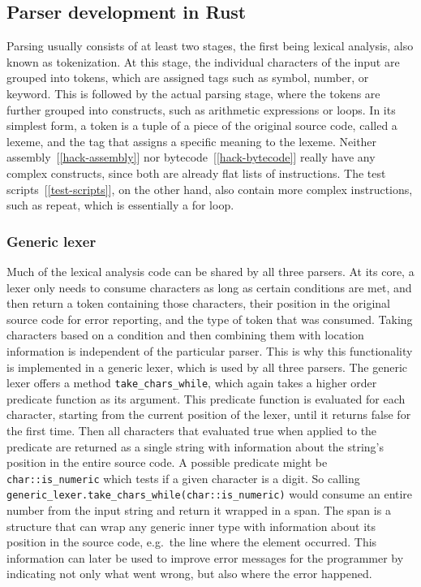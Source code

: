 \subsection{Parser development in Rust} \label{parser-dev}
Parsing usually consists of at least two stages, the first being lexical analysis, also known as tokenization.
At this stage, the individual characters of the input are grouped into tokens, which are assigned tags such as symbol, number, or keyword.
This is followed by the actual parsing stage, where the tokens are further grouped into constructs, such as arithmetic expressions or loops.
In its simplest form, a token is a tuple of a piece of the original source code, called a lexeme, and the tag that assigns a specific meaning to the lexeme.
Neither assembly~[\ref{hack-assembly}] nor bytecode~[\ref{hack-bytecode}] really have any complex constructs, since both are already flat lists of instructions.
The test scripts~[\ref{test-scripts}], on the other hand, also contain more complex instructions, such as repeat, which is essentially a for loop.

\subsubsection{Generic lexer}
Much of the lexical analysis code can be shared by all three parsers.
At its core, a lexer only needs to consume characters as long as certain conditions are met, and then return a token containing those characters, their position in the original source code for error reporting, and the type of token that was consumed.
Taking characters based on a condition and then combining them with location information is independent of the particular parser.
This is why this functionality is implemented in a generic lexer, which is used by all three parsers.
The generic lexer offers a method \verb+take_chars_while+, which again takes a higher order predicate function as its argument.
This predicate function is evaluated for each character, starting from the current position of the lexer, until it returns false for the first time.
Then all characters that evaluated true when applied to the predicate are returned as a single string with information about the string's position in the entire source code.
A possible predicate might be \verb+char::is_numeric+ which tests if a given character is a digit.
So calling \verb+generic_lexer.take_chars_while(char::is_numeric)+ would consume an entire number from the input string and return it wrapped in a span.
\label{spans}
The span is a structure that can wrap any generic inner type with information about its position in the source code, e.g.\ the line where the element occurred.
This information can later be used to improve error messages for the programmer by indicating not only what went wrong, but also where the error happened.

